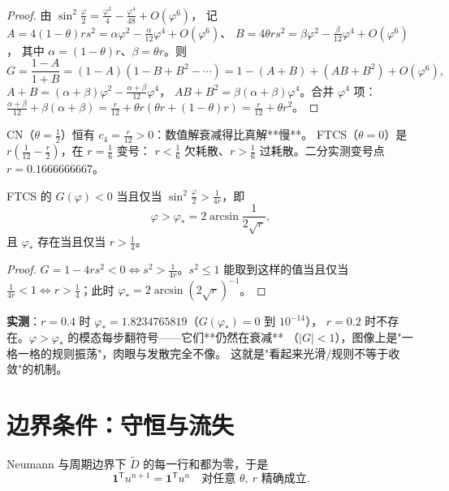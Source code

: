 \begin{proof}
由 $\sin^2\frac\varphi2=\frac{\varphi^2}4-\frac{\varphi^4}{48}+O(\varphi^6)$，
记 $A=4(1-\theta)rs^2=\alpha\varphi^2-\frac{\alpha}{12}\varphi^4+O(\varphi^6)$、
$B=4\theta rs^2=\beta\varphi^2-\frac{\beta}{12}\varphi^4+O(\varphi^6)$，
其中 $\alpha=(1-\theta)r$、$\beta=\theta r$。则
\begin{equation}
  G=\frac{1-A}{1+B}=(1-A)(1-B+B^2-\cdots)
  =1-(A+B)+(AB+B^2)+O(\varphi^6),
\end{equation}
$A+B=(\alpha+\beta)\varphi^2-\frac{\alpha+\beta}{12}\varphi^4$，
$AB+B^2=\beta(\alpha+\beta)\varphi^4$。合并 $\varphi^4$ 项：
$\frac{\alpha+\beta}{12}+\beta(\alpha+\beta)=\frac r{12}+\theta r(\theta r+(1-\theta)r)
=\frac r{12}+\theta r^2$。
\end{proof}

\begin{corollary}[耗散方向会反转]
CN（$\theta=\frac12$）恒有 $c_4=\frac r{12}>0$：数值解衰减得比真解**慢**。
FTCS（$\theta=0$）是 $r(\frac1{12}-\frac r2)$，在 $r=\frac16$ 变号：
$r<\frac16$ 欠耗散、$r>\frac16$ 过耗散。二分实测变号点 $r=0.1666666667$。
\end{corollary}

\begin{theorem}[符号翻转波数]
FTCS 的 $G(\varphi)<0$ 当且仅当 $\sin^2\frac\varphi2>\frac1{4r}$，即
\begin{equation}
  \varphi>\varphi_*=2\arcsin\frac1{2\sqrt r},
\end{equation}
且 $\varphi_*$ 存在当且仅当 $r>\frac14$。
\end{theorem}

\begin{proof}
$G=1-4rs^2<0\iff s^2>\frac1{4r}$。$s^2\le1$ 能取到这样的值当且仅当
$\frac1{4r}<1\iff r>\frac14$；此时 $\varphi_*=2\arcsin(2\sqrt r)^{-1}$。
\end{proof}

\textbf{实测}：$r=0.4$ 时 $\varphi_*=1.8234765819$（$G(\varphi_*)=0$ 到 $10^{-14}$），
$r=0.2$ 时不存在。$\varphi>\varphi_*$ 的模态每步翻符号——它们**仍然在衰减**
（$|G|<1$），图像上是"一格一格的规则振荡"，肉眼与发散完全不像。
这就是"看起来光滑/规则不等于收敛"的机制。

\section{边界条件：守恒与流失}

\begin{theorem}
\label{thm:cons}
Neumann 与周期边界下 $\tilde D$ 的每一行和都为零，于是
\begin{equation}
  \mathbf 1^{\mathsf T}u^{n+1}=\mathbf 1^{\mathsf T}u^n
  \quad\text{对任意 }\theta,\ r\text{ 精确成立}.
\end{equation}
\end{theorem}

